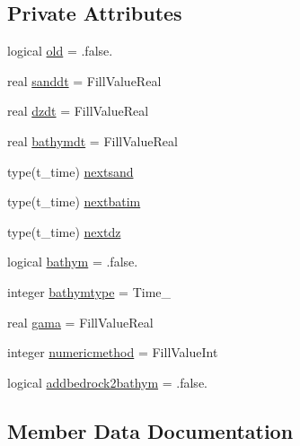\subsection*{Private Attributes}
\begin{DoxyCompactItemize}
\item 
logical \mbox{\hyperlink{structmodulesand_1_1t__evolution_adffacd91063f37149e1d7a6160ba988d}{old}} = .false.
\item 
real \mbox{\hyperlink{structmodulesand_1_1t__evolution_a0d0139dd3357582cb6e5a48270ed209d}{sanddt}} = Fill\+Value\+Real
\item 
real \mbox{\hyperlink{structmodulesand_1_1t__evolution_ad4b85ac8510394c874d465ed22452616}{dzdt}} = Fill\+Value\+Real
\item 
real \mbox{\hyperlink{structmodulesand_1_1t__evolution_a8f27c9bf041bd3bfcb8b43ed307c6d88}{bathymdt}} = Fill\+Value\+Real
\item 
type(t\+\_\+time) \mbox{\hyperlink{structmodulesand_1_1t__evolution_a71935e2393cf749d829361ae477f8cde}{nextsand}}
\item 
type(t\+\_\+time) \mbox{\hyperlink{structmodulesand_1_1t__evolution_a46ab6036d1102f89800b79eaf62e247c}{nextbatim}}
\item 
type(t\+\_\+time) \mbox{\hyperlink{structmodulesand_1_1t__evolution_adea5de16c6493c401599c9487a9c3b6e}{nextdz}}
\item 
logical \mbox{\hyperlink{structmodulesand_1_1t__evolution_a1e61a60eb49c449275c5f0d514c7e40a}{bathym}} = .false.
\item 
integer \mbox{\hyperlink{structmodulesand_1_1t__evolution_ab04bd61c8bc9afd4cbcfc8480c7f2caa}{bathymtype}} = Time\+\_\+
\item 
real \mbox{\hyperlink{structmodulesand_1_1t__evolution_a40ab0fc88f70207b0e71869b32330551}{gama}} = Fill\+Value\+Real
\item 
integer \mbox{\hyperlink{structmodulesand_1_1t__evolution_aea4720da5fa96c5ab542eb677f196da3}{numericmethod}} = Fill\+Value\+Int
\item 
logical \mbox{\hyperlink{structmodulesand_1_1t__evolution_ac67e5593958e8ca88a6cc48bf7fc315a}{addbedrock2bathym}} = .false.
\end{DoxyCompactItemize}


\subsection{Member Data Documentation}
\mbox{\label{structmodulesand_1_1t__evolution_ac67e5593958e8ca88a6cc48bf7fc315a}} 
